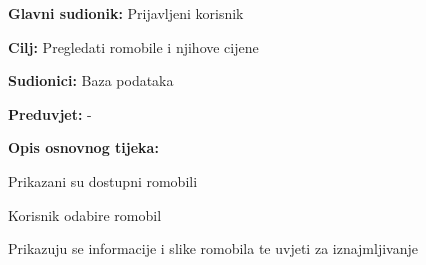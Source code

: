 					\noindent {}
					\begin{packed_item}
	
						\item \textbf{Glavni sudionik: }Prijavljeni korisnik
						\item  \textbf{Cilj: }Pregledati romobile i njihove cijene
						\item  \textbf{Sudionici: }Baza podataka
						\item  \textbf{Preduvjet: }-
						\item  \textbf{Opis osnovnog tijeka:}
						
						\item[] \begin{packed_enum}
	
							\item Prikazani su dostupni romobili
							\item Korisnik odabire romobil
							\item Prikazuju se informacije i slike romobila te uvjeti za iznajmljivanje

						\end{packed_enum}
					\end{packed_item}
						
					


